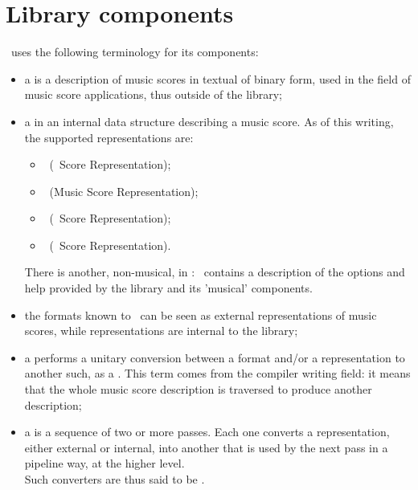 
\chapter{Library components}\label{Library components}

\mf\ uses the following terminology for its components:
\begin{itemize}
\item a  is a description of music scores in textual of binary form, used in the field of music score applications, thus outside of the library;

\item a  in an internal data structure describing a music score. As of this writing, the supported representations are:
\begin{itemize}
\item \mxsrRepr\ (\mxml\ Score Representation);
\item \msrRepr\ (Music Score Representation);
\item \lpsrRepr\ (\lily\ Score Representation);
\item \bsrRepr\ (\braille\ Score Representation).
\end{itemize}

There is another, non-musical,  in \mf: \oahRepr\ contains a description of the options and help provided by the library and its 'musical' components.

\item the formats known to \mf\ can be seen as external representations of music scores, while representations are internal to the library;

\item a  performs a unitary conversion between a format and/or a representation to another such, as a . This term comes from the compiler writing field: it means that the whole music score description is traversed to produce another description;

\item a  is a sequence of two or more passes. Each one converts a representation, either external or internal, into another that is used by the next pass in a pipeline way, at the higher level. \\
Such converters are thus said to be .


\end{itemize}
